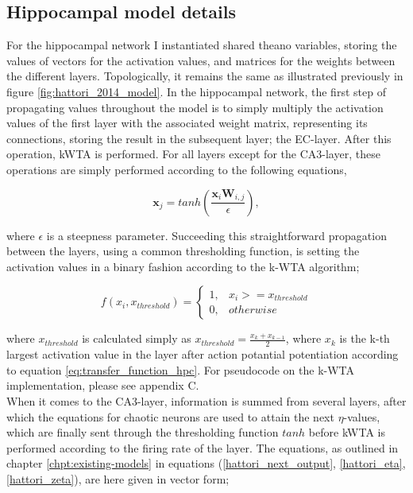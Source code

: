 \subsection{Hippocampal model details}

For the hippocampal network I instantiated shared theano variables, storing the values of vectors for the activation values, and matrices for the weights between the different layers. Topologically, it remains the same as illustrated previously in figure \ref{fig:hattori_2014_model}. In the hippocampal network, the first step of propagating values throughout the model is to simply multiply the activation values of the first layer with the associated weight matrix, representing its connections, storing the result in the subsequent layer; the EC-layer. After this operation, kWTA is performed. For all layers except for the CA3-layer, these operations are simply performed according to the following equations,

\begin{equation}\label{eq:transfer_function_hpc}
    \textbf{x}_j = tanh (\frac{\textbf{x}_i \textbf{W}_{i,j}}{\epsilon}),
\end{equation}

where $\epsilon$ is a steepness parameter. Succeeding this straightforward propagation between the layers, using a common thresholding function, is setting the activation values in a binary fashion according to the k-WTA algorithm;

\begin{equation}
    f(x_i, x_{threshold}) = \begin{cases}
    1, & x_i >= x_{threshold} \\
    0, & otherwise
    \end{cases}
\end{equation}

where $x_{threshold}$ is calculated simply as $x_{threshold} = \frac{x_{k} + x_{k-1}}{2}$, where $x_k$ is the k-th largest activation value in the layer after action potantial potentiation according to equation \ref{eq:transfer_function_hpc}. For pseudocode on the k-WTA implementation, please see appendix C.
\\

When it comes to the CA3-layer, information is summed from several layers, after which the equations for chaotic neurons are used to attain the next $\eta$-values, which are finally sent through the thresholding function $tanh$ before kWTA is performed according to the firing rate of the layer. The equations, as outlined in chapter \ref{chpt:existing-models} in equations (\ref{hattori_next_output}, \ref{hattori_eta}, \ref{hattori_zeta}), are here given in vector form;


